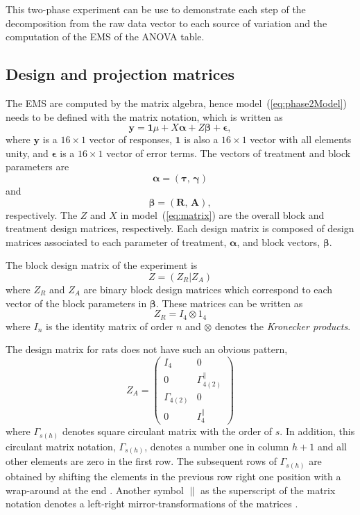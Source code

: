 \documentclass[article]{jss}
\begin{document}
This two-phase experiment can be use to demonstrate each step of the decomposition from the raw data vector to each source of variation and the computation of the EMS of the ANOVA table.

\subsection{Design and projection matrices}\label{subsec:desAndProj}
The EMS are computed by the matrix algebra, hence model~(\ref{eq:phase2Model}) needs to be defined with the matrix notation, which is written as
\begin{equation}\label{eq:matrix}
\bm{y} = \bm{1}\mu + X\bm{\alpha} + Z\bm{\beta} + \bm{\epsilon},
\end{equation}
where $\bm{y}$ is a $16 \times 1$ vector of responses, $\bm{1}$ is also a $16 \times 1$ vector with all elements unity, and $\bm{\epsilon}$ is a $16 \times 1$ vector of error terms. The vectors of treatment and block parameters are
\begin{equation}\label{eq:treatPar}
\bm{\alpha} = (\bm{\tau}, \, \bm{\gamma} )
\end{equation}
and
\begin{equation}\label{eq:blockPar}
\bm{\beta}= (\bm{R},\, \bm{A}),
\end{equation}
respectively. The $Z$ and $X$ in model~(\ref{eq:matrix}) are the overall block and treatment design matrices, respectively. Each design matrix is composed of design matrices associated to each parameter of treatment, $\bm{\alpha}$, and block vectors, $\bm{\beta}$.

The block design matrix of the experiment is
\[Z = (Z_R | Z_A )\]
where $Z_R$ and $Z_A$ are binary block design matrices which correspond to each vector of the block parameters in $\bm{\beta}$. These matrices can be written as
\[Z_R	= I_4 \otimes 1_4 \]
where $I_n$ is the identity matrix of order $n$ and $\otimes$ denotes the \emph{Kronecker products}.

The design matrix for rats does not have such an obvious pattern,
\[
Z_A =
\begin{pmatrix}
I_4& 0\\
0& \Gamma_{4(2)}^{\parallel}\\
\Gamma_{4(2)}& 0\\
0& I_{4}^{\parallel}
\end{pmatrix}
\]
where $\Gamma_{s(h)}$ denotes square circulant matrix with the order of $s$. In addition, this circulant matrix notation, $\Gamma_{s(h)}$, denotes a number one in column $h+1$ and all other elements are zero in the first row. The subsequent rows of $\Gamma_{s(h)}$ are obtained by shifting the elements in the previous row right one position with a wrap-around at the end \citep{John1987}. Another symbol $\parallel$ as the superscript of the matrix notation denotes a left-right mirror-transformations of the matrices \citep{Li2003}.
\end{document}
